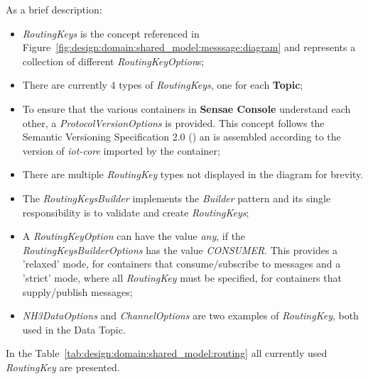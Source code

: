 As a brief description:

\begin{itemize}
   \item \textit{RoutingKeys} is the concept referenced in Figure~\ref{fig:design:domain:shared_model:messsage:diagram} and represents a collection of different \textit{RoutingKeyOption}s;
   \item There are currently 4 types of \textit{RoutingKeys}, one for each \textbf{Topic};
   \item To ensure that the various containers in \textbf{Sensae Console} understand each other, a \textit{ProtocolVersionOptions} is provided. This concept follows the Semantic Versioning Specification 2.0 (\cite{semver}) an is assembled according to the version of \textit{iot-core} imported by the container;
   \item There are multiple \textit{RoutingKey} types not displayed in the diagram for brevity.
   \item The \textit{RoutingKeysBuilder} implements the \textit{Builder} pattern and its single responsibility is to validate and create \textit{RoutingKeys};
   \item A \textit{RoutingKeyOption} can have the value \textit{any}, if the \textit{RoutingKeysBuilderOptions} has the value \textit{CONSUMER}. This provides a 'relaxed' mode, for containers that consume/subscribe to messages and a 'strict' mode, where all \textit{RoutingKey} must be specified, for containers that supply/publish messages;
   \item \textit{NH3DataOptions} and \textit{ChannelOptions} are two examples of \textit{RoutingKey}, both used in the Data Topic.
\end{itemize}

In the Table~\ref{tab:design:domain:shared_model:routing} all currently used \textit{RoutingKey} are presented.

